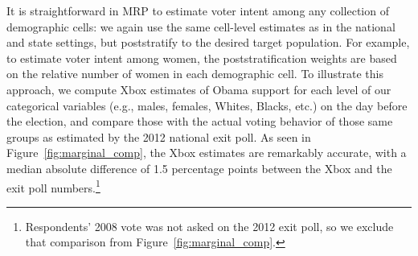 \documentclass[preprint,authoryear,12pt]{elsarticle}
\begin{document}
It is straightforward in MRP to estimate
voter intent among any collection of demographic cells: we again use the same cell-level estimates as in the
national and state settings, but poststratify to the desired target population. For example, to estimate
voter intent among women, the poststratification weights are based on the relative number of women in each demographic cell.
To illustrate this approach, we compute Xbox estimates of Obama support for each
level of our categorical variables (e.g., males, females, Whites, Blacks, etc.)
on the day before the election, and compare those with the actual voting
behavior of those same groups as estimated by the 2012 national exit poll.  As
seen in Figure~\ref{fig:marginal_comp}, the Xbox estimates are remarkably
accurate, with a median absolute difference of 1.5 percentage points between
the Xbox and the exit poll numbers.\footnote{Respondents' 2008 vote was not asked on
  the 2012 exit poll, so we exclude that comparison from
  Figure~\ref{fig:marginal_comp}.}
\end{document}
